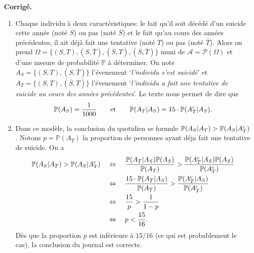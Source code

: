 \documentclass[a4paper,11pt]{article}
\let\originalleft\left
\let\originalright\right
\renewcommand{\left}{\mathopen{}\mathclose\bgroup\originalleft}
\renewcommand{\right}{\aftergroup\egroup\originalright}
\renewcommand{\P}{\mathbb{P}}
\newcommand{\1}{\mathbbm{1}}
\newcommand{\cA}{\mathcal{A}}
\newcommand{\cP}{\mathcal{P}}
\newcommand{\Ppsq}[2]{\mathbb{P} \left(#1\middle|#2\right)}
\theoremstyle{plain}
\theoremstyle{definition}
\renewenvironment{comment}{\medskip\noindent \textcolor{BrickRed}{\textbf{Corrigé.}}}{}
\begin{document}
\begin{comment}
\begin{enumerate}
	\item Chaque individu à deux caractéristiques: le fait qu'il soit décédé d'un suicide cette année (noté $S$) ou pas (noté $\overline{S}$) et le fait qu'au cours des années précédentes, il ait déjà fait une tentative (noté $T$) ou pas (noté $\overline{T}$). 
    Alors on prend $\Omega = \{ (S,T),(S,\overline{T}),(\overline{S},T),(\overline{S},\overline{T}) \}$ muni de $\cA = \cP(\Omega)$ et d'une mesure de probabilité $\P$ à déterminer.
    On note $A_S = \{ (S,T),(S,\overline{T})\}$ l'évenement `\textit{l'individu s'est suicidé}' et $A_T = \{ (S,T),(\overline{S},T)\}$ l'évenement `\textit{l'individu a fait une tentative de suicide au cours des années précédentes}'.
    Le texte nous permet de dire que
    \[
        \P(A_S) = \frac{1}{1000}
        \qquad \text{et} \qquad 
        \Ppsq{A_T}{A_S} = 15 \cdot \Ppsq{A_T^c}{A_S}.
    \]
	\item Dans ce modèle, la conclusion du quotidien se formule $\Ppsq{A_S}{A_T} > \Ppsq{A_S}{A_T^c}$. 
    Notons $p = \P(A_T)$ la proportion de personnes ayant déja fait une tentative de suicide.
    On a
    \begin{align*}
    \Ppsq{A_S}{A_T} > \Ppsq{A_S}{A_T^c}
    & \quad \Leftrightarrow \quad 
    \frac{\Ppsq{A_T}{A_S} \P(A_S)}{\P(A_T)} > \frac{\Ppsq{A_T^c}{A_S} \P(A_S)}{\P(A_T^c)} \\
    & \quad \Leftrightarrow \quad 
    \frac{15 \cdot \Ppsq{A_T}{A_S}}{\P(A_T)} > \frac{\Ppsq{A_T^c}{A_S}}{\P(A_T^c)} \\
    & \quad \Leftrightarrow \quad 
    \frac{15}{p} > \frac{1}{1-p} \\
    & \quad \Leftrightarrow \quad 
    p < \frac{15}{16}.
    \end{align*}
    Dès que la proportion $p$ est inférieure à $15/16$ (ce qui est probablement le cas), la conclusion du journal est correcte.
    \end{enumerate}
\end{comment}
\end{document}
